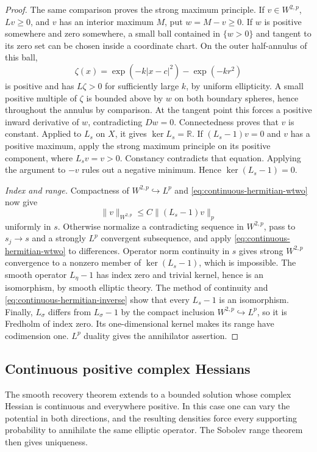 \begin{proof}
The same comparison proves the strong maximum principle. If
$v\in W^{2,p}$, $Lv\geq0$, and $v$ has an interior maximum $M$, put
$w=M-v\geq0$. If $w$ is positive somewhere and zero somewhere, a small
ball contained in $\{w>0\}$ and tangent to its zero set can be chosen
inside a coordinate chart. On the outer half-annulus of this ball,
\[
 \zeta(x)=\exp(-k|x-c|^2)-\exp(-kr^2)
\]
is positive and has $L\zeta>0$ for sufficiently large $k$, by uniform
ellipticity. A small positive multiple of $\zeta$ is bounded above by
$w$ on both boundary spheres, hence throughout the annulus by comparison.
At the tangent point this forces a positive inward derivative of $w$,
contradicting $Dw=0$. Connectedness proves that $v$ is constant.
Applied to $L_s$ on $X$, it gives $\ker L_s=\mathbb R$. If
$(L_s-1)v=0$ and $v$ has a positive maximum, apply the strong maximum
principle on its positive component, where $L_sv=v>0$. Constancy
contradicts that equation. Applying the argument to $-v$ rules out a
negative minimum. Hence $\ker(L_s-1)=0$.

\emph{Index and range.} Compactness of $W^{2,p}\hookrightarrow L^p$
and \eqref{eq:continuous-hermitian-wtwo} now give
\begin{equation}\label{eq:continuous-hermitian-inverse}
 \|v\|_{W^{2,p}}\leq C\|(L_s-1)v\|_p
\end{equation}
uniformly in $s$. Otherwise normalize a contradicting sequence in
$W^{2,p}$, pass to $s_j\to s$ and a strongly $L^p$ convergent subsequence,
and apply \eqref{eq:continuous-hermitian-wtwo} to differences. Operator
norm continuity in $s$ gives strong $W^{2,p}$ convergence to a nonzero
member of $\ker(L_s-1)$, which is impossible.
The smooth operator $L_\eta-1$ has index zero and trivial kernel, hence
is an isomorphism, by smooth elliptic theory. The method of continuity
and \eqref{eq:continuous-hermitian-inverse} show that every $L_s-1$ is
an isomorphism. Finally, $L_\sigma$ differs from $L_\sigma-1$ by the
compact inclusion $W^{2,p}\hookrightarrow L^p$, so it is Fredholm of
index zero. Its one-dimensional kernel makes its range have codimension
one. $L^p$ duality gives the annihilator assertion.
\end{proof}

\subsection{Continuous positive complex Hessians}
\label{subsec:continuous-hessian-adjoints}

The smooth recovery theorem extends to a bounded solution whose complex
Hessian is continuous and everywhere positive. In this case one can
vary the potential in both directions, and the resulting densities
force every supporting probability to annihilate the same elliptic
operator. The Sobolev range theorem then gives uniqueness.

